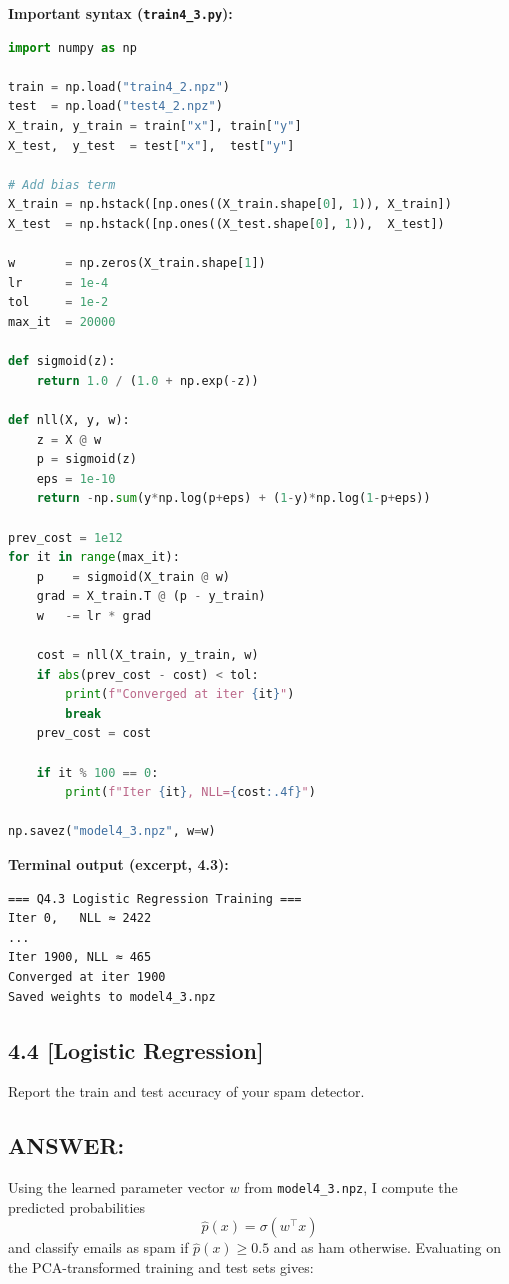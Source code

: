 \documentclass[12pt]{article}
\begin{document}
\textbf{Important syntax (\texttt{train4\_3.py}):}
\begin{lstlisting}[language=Python]
import numpy as np

train = np.load("train4_2.npz")
test  = np.load("test4_2.npz")
X_train, y_train = train["x"], train["y"]
X_test,  y_test  = test["x"],  test["y"]

# Add bias term
X_train = np.hstack([np.ones((X_train.shape[0], 1)), X_train])
X_test  = np.hstack([np.ones((X_test.shape[0], 1)),  X_test])

w       = np.zeros(X_train.shape[1])
lr      = 1e-4
tol     = 1e-2
max_it  = 20000

def sigmoid(z):
    return 1.0 / (1.0 + np.exp(-z))

def nll(X, y, w):
    z = X @ w
    p = sigmoid(z)
    eps = 1e-10
    return -np.sum(y*np.log(p+eps) + (1-y)*np.log(1-p+eps))

prev_cost = 1e12
for it in range(max_it):
    p    = sigmoid(X_train @ w)
    grad = X_train.T @ (p - y_train)
    w   -= lr * grad

    cost = nll(X_train, y_train, w)
    if abs(prev_cost - cost) < tol:
        print(f"Converged at iter {it}")
        break
    prev_cost = cost

    if it % 100 == 0:
        print(f"Iter {it}, NLL={cost:.4f}")

np.savez("model4_3.npz", w=w)
\end{lstlisting}

\textbf{Terminal output (excerpt, 4.3):}
\begin{lstlisting}
=== Q4.3 Logistic Regression Training ===
Iter 0,   NLL ≈ 2422
...
Iter 1900, NLL ≈ 465
Converged at iter 1900
Saved weights to model4_3.npz
\end{lstlisting}

\subsection*{4.4 [Logistic Regression]}
Report the train and test accuracy of your spam detector.

\subsection*{ANSWER:}
Using the learned parameter vector $w$ from \texttt{model4\_3.npz}, I compute
the predicted probabilities
\[
\hat{p}(x) = \sigma(w^\top x)
\]
and classify emails as spam if $\hat{p}(x) \ge 0.5$ and as ham otherwise.
Evaluating on the PCA-transformed training and test sets gives:
\end{document}
